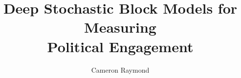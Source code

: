 

%





\title{Deep Stochastic Block Models for Measuring \\[1ex]Political Engagement}

\author{Cameron Raymond}


\figurespagefalse
\tablespagefalse

\beforepreface



